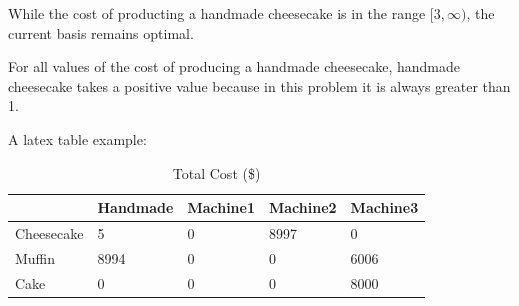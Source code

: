 \documentclass{article}
\begin{document}
While the cost of producting a handmade cheesecake is in the range $[3, \infty)$, the current basis remains optimal.

For all values of the cost of producing a handmade cheesecake, handmade cheesecake takes a positive value because in this problem it is always greater than 1.

A latex table example:

\begin{table}[H]
    \centering
    \caption{Total Cost (\$)}
    \begin{tabular}{lllll}
        \hline
        \multicolumn{1}{|l|}{}           & \multicolumn{1}{l|}{Handmade} & \multicolumn{1}{l|}{Machine1} & \multicolumn{1}{l|}{Machine2} & \multicolumn{1}{l|}{Machine3} \\ \hline
        \multicolumn{1}{|l|}{Cheesecake} & \multicolumn{1}{l|}{5}        & \multicolumn{1}{l|}{0}        & \multicolumn{1}{l|}{8997}     & \multicolumn{1}{l|}{0}        \\ \hline
        \multicolumn{1}{|l|}{Muffin}     & \multicolumn{1}{l|}{8994}     & \multicolumn{1}{l|}{0}        & \multicolumn{1}{l|}{0}        & \multicolumn{1}{l|}{6006}     \\ \hline
        \multicolumn{1}{|l|}{Cake}       & \multicolumn{1}{l|}{0}        & \multicolumn{1}{l|}{0}        & \multicolumn{1}{l|}{0}        & \multicolumn{1}{l|}{8000}     \\ \hline
    \end{tabular}
\end{table}
\end{document}
